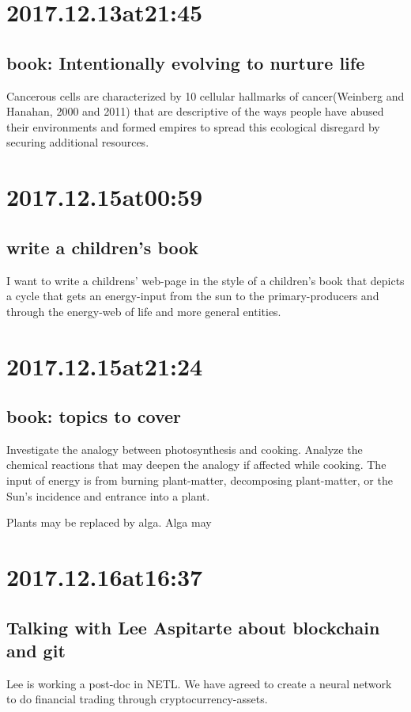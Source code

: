 \section*{ 2017.12.13at21:45 }
\subsection*{ book: Intentionally evolving to nurture life }
Cancerous cells are characterized by 10 cellular hallmarks of cancer(Weinberg and Hanahan, 2000 and 2011) that are descriptive of the ways people have abused their environments and formed empires to spread this ecological disregard by securing additional resources.

\section*{ 2017.12.15at00:59 }
\subsection*{ write a children's book }
I want to write a childrens' web-page in the style of a children's book that depicts a cycle that gets an energy-input from the sun to the primary-producers and through the energy-web of life and more general entities.


\section*{ 2017.12.15at21:24 }
\subsection*{ book: topics to cover }
Investigate the analogy between photosynthesis and cooking. Analyze the chemical reactions that may deepen the analogy if affected while cooking. The input of energy is from burning plant-matter, decomposing plant-matter, or the Sun's incidence and entrance into a plant.

Plants may be replaced by alga. Alga may 

\section*{ 2017.12.16at16:37 }
\subsection*{ Talking with Lee Aspitarte about blockchain and git }
Lee is working a post-doc in NETL. We have agreed to create a neural network to do financial trading through cryptocurrency-assets.

